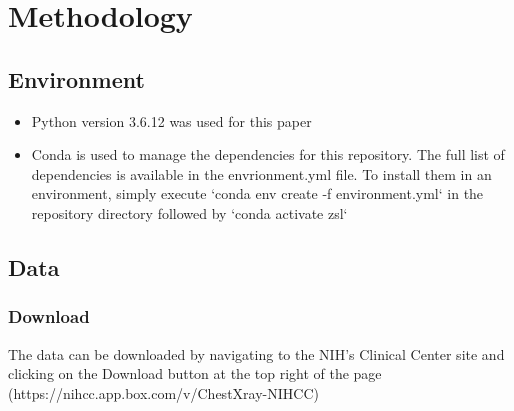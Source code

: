 \documentclass[letterpaper]{article} %
\begin{document}
\section{Methodology}

\subsection{Environment}
\begin{itemize}
    \item Python version 3.6.12 was used for this paper
    \item Conda is used to manage the dependencies for this repository. The full list of dependencies is available in the envrionment.yml file. To install them in an environment, simply execute `conda env create -f environment.yml` in the repository directory followed by `conda activate zsl`
\end{itemize}

\subsection{Data}

\subsubsection{Download}
The data can be downloaded by navigating to the NIH's Clinical Center site and clicking on the Download button at the top right of the page (https://nihcc.app.box.com/v/ChestXray-NIHCC)
\end{document}
